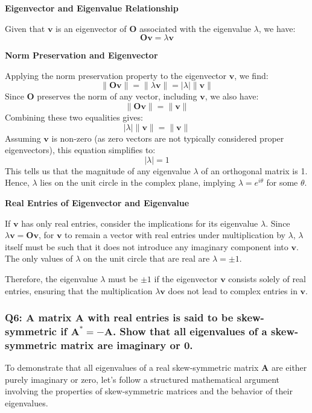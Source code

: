 \documentclass[8pt]{article}
\begin{document}
{{\textbf{Eigenvector and Eigenvalue Relationship}

Given that \(\mathbf{v}\) is an eigenvector of \(\mathbf{O}\) associated with the eigenvalue \(\lambda\), we have:
\[
\mathbf{Ov} = \lambda \mathbf{v}
\]

\textbf{Norm Preservation and Eigenvector}

Applying the norm preservation property to the eigenvector \(\mathbf{v}\), we find:
\[
\|\mathbf{Ov}\| = \|\lambda \mathbf{v}\| = |\lambda| \|\mathbf{v}\|
\]
Since \(\mathbf{O}\) preserves the norm of any vector, including \(\mathbf{v}\), we also have:
\[
\|\mathbf{Ov}\| = \|\mathbf{v}\|
\]
Combining these two equalities gives:
\[
|\lambda| \|\mathbf{v}\| = \|\mathbf{v}\|
\]
Assuming \(\mathbf{v}\) is non-zero (as zero vectors are not typically considered proper eigenvectors), this equation simplifies to:
\[
|\lambda| = 1
\]
This tells us that the magnitude of any eigenvalue \(\lambda\) of an orthogonal matrix is 1. Hence, \(\lambda\) lies on the unit circle in the complex plane, implying \(\lambda = e^{i\theta}\) for some \(\theta\).

\textbf{Real Entries of Eigenvector and Eigenvalue}

If \(\mathbf{v}\) has only real entries, consider the implications for its eigenvalue \(\lambda\). Since \(\lambda \mathbf{v} = \mathbf{Ov}\), for \(\mathbf{v}\) to remain a vector with real entries under multiplication by \(\lambda\), \(\lambda\) itself must be such that it does not introduce any imaginary component into \(\mathbf{v}\). The only values of \(\lambda\) on the unit circle that are real are \(\lambda = \pm 1\).

Therefore, the eigenvalue \(\lambda\) must be \(\pm 1\) if the eigenvector \(\mathbf{v}\) consists solely of real entries, ensuring that the multiplication \(\lambda \mathbf{v}\) does not lead to complex entries in \(\mathbf{v}\).

\subsubsection*{Q6: A matrix \(\mathbf{A}\) with real entries is said to be skew-symmetric if \(\mathbf{A}^* = -\mathbf{A}\). Show that all eigenvalues of a skew-symmetric matrix are imaginary or 0.}

To demonstrate that all eigenvalues of a real skew-symmetric matrix \(\mathbf{A}\) are either purely imaginary or zero, let's follow a structured mathematical argument involving the properties of skew-symmetric matrices and the behavior of their eigenvalues.

}}
\end{document}
